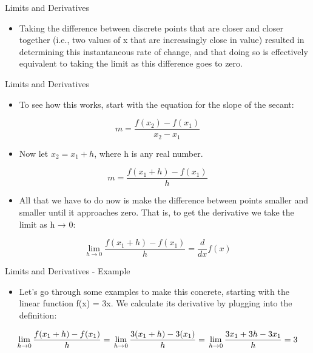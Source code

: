 \documentclass[
  ignorenonframetext,
]{beamer}
\providecommand{\tightlist}{%
  \setlength{\itemsep}{0pt}\setlength{\parskip}{0pt}}
\begin{document}
\begin{frame}{Limits and Derivatives}
\protect\hypertarget{limits-and-derivatives}{}

\begin{itemize}
\tightlist
\item
  Taking the difference between discrete points that are closer and
  closer together (i.e., two values of x that are increasingly close in
  value) resulted in determining this instantaneous rate of change, and
  that doing so is effectively equivalent to taking the limit as this
  difference goes to zero.
\end{itemize}

\end{frame}

\begin{frame}{Limits and Derivatives}
\protect\hypertarget{limits-and-derivatives-1}{}

\begin{itemize}
\tightlist
\item
  To see how this works, start with the equation for the slope of the
  secant:
\end{itemize}

\[m = \frac{f(x_{2}) -f(x_{1})}{x_{2}- x_{1}}\]

\begin{itemize}
\tightlist
\item
  Now let \(x_{2} = x_{1} + h\), where h is any real number.
\end{itemize}

\[m = \frac{f(x_{1}+ h) -f(x_{1})}{h}\]

\begin{itemize}
\tightlist
\item
  All that we have to do now is make the difference between points
  smaller and smaller until it approaches zero. That is, to get the
  derivative we take the limit as h → 0:
\end{itemize}

\[ \lim_{h \to 0}\frac{f(x_{1}+ h) -f(x_{1})}{h}= \frac{d}{dx}f(x)\]

\end{frame}

\begin{frame}{Limits and Derivatives - Example}
\protect\hypertarget{limits-and-derivatives---example}{}

\begin{itemize}
\tightlist
\item
  Let's go through some examples to make this concrete, starting with
  the linear function f(x) = 3x. We calculate its derivative by plugging
  into the definition:
\end{itemize}

\[ \lim_{h \to 0}\frac{f(x_{1}+ h) -f(x_{1})}{h}= \\ \lim_{h \to 0}\frac{3(x_{1}+ h) - 3(x_{1})}{h} = \\ \lim_{h \to 0}\frac{3x_{1}+ 3h - 3x_{1}}{h} = 3\]

\end{frame}
\end{document}
